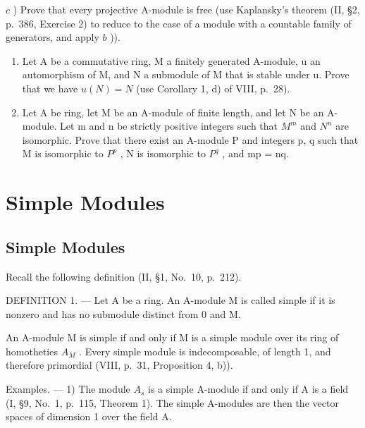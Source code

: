 \(c\) ) Prove that every projective A-module is free (use Kaplansky's theorem (II, §2, p.~386, Exercise 2) to reduce to the case of a module with a countable family of generators, and apply \(b\) )).

\begin{enumerate}
\def\labelenumi{\arabic{enumi})}
\setcounter{enumi}{18}
\item
  Let A be a commutative ring, M a finitely generated A-module, u an automorphism of M, and N a submodule of M that is stable under u. Prove that we have \(u(N) = N\) (use Corollary 1, d) of VIII, p.~28).
\item
  Let A be ring, let M be an A-module of finite length, and let N be an A-module. Let m and n be strictly positive integers such that \(M^{m}\) and \(N^{n}\) are isomorphic. Prove that there exist an A-module P and integers p, q such that M is isomorphic to \(P^{p}\) , N is isomorphic to \(P^{q}\) , and mp = nq.
\end{enumerate}

\section{Simple Modules}

\subsection{Simple Modules}

Recall the following definition (II, §1, No.~10, p.~212).

DEFINITION 1. --- Let A be a ring. An A-module M is called simple if it is nonzero and has no submodule distinct from 0 and M.

An A-module M is simple if and only if M is a simple module over its ring of homotheties \(A_{M}\) . Every simple module is indecomposable, of length 1, and therefore primordial (VIII, p.~31, Proposition 4, b)).

Examples. --- 1) The module \(A_{s}\) is a simple A-module if and only if A is a field (I, §9, No.~1, p.~115, Theorem 1). The simple A-modules are then the vector spaces of dimension 1 over the field A.

